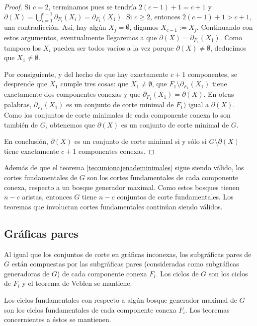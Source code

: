 \begin{proof}
Si $c=2$, terminamos pues se tendría $2(c-1)+1 = c+1$ y $\partial(X) = \bigcup_{i=1}^{c-1} \partial_{F_{i}}(X_{i})= \partial_{F_{1}}(X_{1})$. Si $c \geq 2$, entonces $2(c-1) + 1 > c+1$, una contradicción. Así, hay algún $X_{j} =\emptyset$, digamos $X_{c-1}:=X_{j}$. Continuando con estos argumentos, eventualmente llegaremos a que $\partial(X) = \partial_{F_{1}}(X_{1})$. Como tampoco los $X_{i}$ pueden ser todos vacíos a la vez porque $\partial(X) \neq \emptyset$, deducimos que $X_{1} \neq \emptyset$. 


Por consiguiente, y del hecho de que hay exactamente $c+1$ componentes, se desprende que $X_{1}$ cumple tres cosas: que $X_{1} \neq \emptyset$, que $F_{1} \setminus \partial_{F_{1}}(X_{1})$ tiene exactamente dos componentes conexas y que $\partial_{F_{1}}(X_{1})=\partial(X)$. En otras palabras, $\partial_{F_{1}}(X_{1})$ es un conjunto de corte minimal de $F_{1})$ igual a $\partial(X)$. Como los conjuntos de corte minimales de cada componente conexa lo son también de $G$, obtenemos que $\partial(X)$ es un conjunto de corte minimal de $G$.

En conclusión, $\partial(X)$ es un conjunto de corte minimal si y sólo si $G \setminus \partial(X)$ tiene exactamente $c+1$ componentes conexas.

\end{proof}
   
   Además de que el teorema \ref{teo:unionajenademinimales} sigue siendo válido, los cortes fundamentales de $G$ son los cortes fundamentales de cada componente conexa, respecto a un bosque generador maximal. Como estos bosques tienen $n-c$ aristas, entonces $G$ tiene $n - c$ conjuntos de corte fundamentales. Los teoremas que involucran cortes fundamentales continúan siendo válidos.
 
  \subsection{Gráficas pares}
  
  Al igual que los conjuntos de corte en gráficas inconexas, los subgráficas pares de $G$ están compuestas por las subgráficas pares (consideradas como subgráficas generadoras de $G$) de cada componente conexa  $F_{i}$. Los ciclos de $G$ son los ciclos de $F_{i}$ y el teorema de Veblen se mantiene. 
  
  Los ciclos fundamentales con respecto a algún bosque generador maximal de $G$ son los ciclos fundamentales de cada componente conexa $F_{i}$. Los teoremas concernientes a éstos se mantienen. 
  
